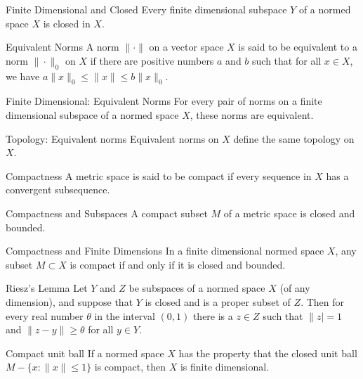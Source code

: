 \documentclass[avery5388,grid,frame]{flashcards}
\begin{document}
\begin{flashcard}[Theorem]{Finite Dimensional and Closed}
Every finite dimensional subspace $Y$ of a normed space $X$ is closed in $X$.
\end{flashcard}

\begin{flashcard}[Definition]{Equivalent Norms}
A norm $\|\cdot\|$ on a vector space $X$ is said to be equivalent to a norm $\|\cdot\|_0$ on $X$ if there are positive numbers $a$ and $b$ such that for all $x\in X$, we have $a\|x\|_0\leq\|x\|\leq b\|x\|_0$.
\end{flashcard}

\begin{flashcard}[Theorem]{Finite Dimensional: Equivalent Norms}
For every pair of norms on a finite dimensional subspace of a normed space $X$, these norms are equivalent.
\end{flashcard}

\begin{flashcard}[Theorem]{Topology: Equivalent norms}
Equivalent norms on $X$ define the same topology on $X$.
\end{flashcard}

\begin{flashcard}[Definition]{Compactness}
A metric space is said to be compact if every sequence in $X$ has a convergent subsequence.
\end{flashcard}

\begin{flashcard}[Theorem]{Compactness and Subspaces}
A compact subset $M$ of a metric space is closed and bounded.
\end{flashcard}

\begin{flashcard}[Theorem]{Compactness and Finite Dimensions}
In a finite dimensional normed space $X$, any subset $M\subset X$ is compact if and only if it is closed and bounded.
\end{flashcard}

\begin{flashcard}[Theorem]{Riesz's Lemma}
Let $Y$ and $Z$ be subspaces of a normed space $X$ (of any dimension), and suppose that $Y$ is closed and is a proper subset of $Z$. Then for every real number $\theta$ in the interval $(0,1)$ there is a $z\in Z$ such that $\|z|=1$ and $\|z-y\|\geq\theta$ for all $y\in Y$.
\end{flashcard}

\begin{flashcard}[Theorem]{Compact unit ball}
If a normed space $X$ has the property that the closed unit ball $M-\{x\colon\|x\|\leq 1\}$ is compact, then $X$ is finite dimensional.
\end{flashcard}
\end{document}
